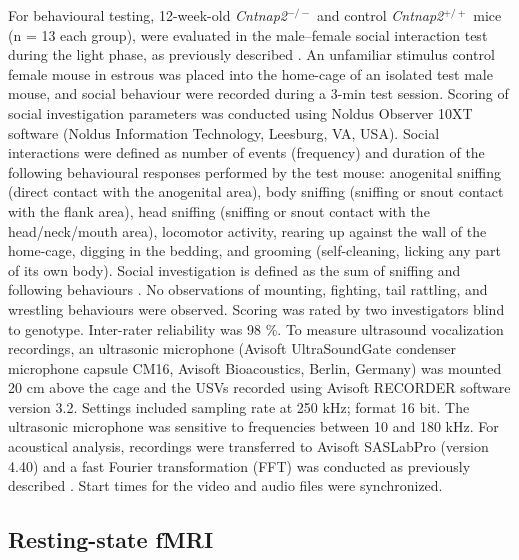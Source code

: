 For behavioural testing, 12-week-old \textit{Cntnap2}$^{-/-}$ and control \textit{Cntnap2}$^{+/+}$ mice (n =
13 each group), were evaluated in the male–female social interaction test during
the light phase, as previously described \parencite{scattoni2011, scattoni2013}.
An unfamiliar stimulus control female mouse in estrous was placed into the
home-cage of an isolated test male mouse, and social behaviour were recorded
during a 3-min test session. Scoring of social investigation parameters was
conducted using Noldus Observer 10XT software (Noldus Information Technology,
Leesburg, VA, USA). Social interactions were defined as number of events
(frequency) and duration of the following behavioural responses performed by the
test mouse: anogenital sniffing (direct contact with the anogenital area), body
sniffing (sniffing or snout contact with the flank area), head sniffing
(sniffing or snout contact with the head/neck/mouth area), locomotor activity,
rearing up against the wall of the home-cage, digging in the bedding, and
grooming (self-cleaning, licking any part of its own body). Social investigation
is defined as the sum of sniffing and following behaviours
\parencite{scattoni2008}. No observations of mounting, fighting, tail rattling,
and wrestling behaviours were observed. Scoring was rated by two investigators
blind to genotype. Inter-rater reliability was 98 \%. To measure ultrasound
vocalization recordings, an ultrasonic microphone (Avisoft UltraSoundGate
condenser microphone capsule CM16, Avisoft Bioacoustics, Berlin, Germany) was
mounted 20 cm above the cage and the USVs recorded using Avisoft RECORDER
software version 3.2. Settings included sampling rate at 250 kHz; format 16 bit.
The ultrasonic microphone was sensitive to frequencies between 10 and 180 kHz.
For acoustical analysis, recordings were transferred to Avisoft SASLabPro
(version 4.40) and a fast Fourier transformation (FFT) was conducted as
previously described \parencite{scattoni2008}. Start times for the video and
audio files were synchronized. 

\subsection{Resting-state fMRI}

